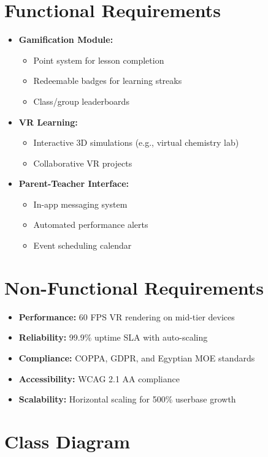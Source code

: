 \documentclass[12pt,a4paper]{article}
\begin{document}
\section{Functional Requirements}
\begin{itemize}[leftmargin=*]
  \item \textbf{Gamification Module:}
  \begin{itemize}
    \item Point system for lesson completion
    \item Redeemable badges for learning streaks
    \item Class/group leaderboards
  \end{itemize}
  
  \item \textbf{VR Learning:}
  \begin{itemize}
    \item Interactive 3D simulations (e.g., virtual chemistry lab)
    \item Collaborative VR projects
  \end{itemize}
  
  \item \textbf{Parent-Teacher Interface:}
  \begin{itemize}
    \item In-app messaging system
    \item Automated performance alerts
    \item Event scheduling calendar
  \end{itemize}
\end{itemize}

\section{Non-Functional Requirements}
\begin{itemize}[leftmargin=*]
  \item \textbf{Performance:} 60 FPS VR rendering on mid-tier devices
  \item \textbf{Reliability:} 99.9\% uptime SLA with auto-scaling
  \item \textbf{Compliance:} COPPA, GDPR, and Egyptian MOE standards
  \item \textbf{Accessibility:} WCAG 2.1 AA compliance
  \item \textbf{Scalability:} Horizontal scaling for 500\% userbase growth
\end{itemize}
\section{Class Diagram}
\end{document}
